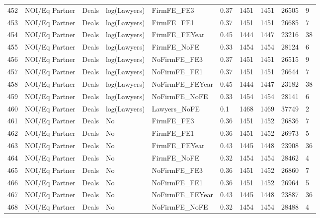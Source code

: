 \documentclass{article}
\begin{document}
\begin{table}[H]
\begin{tabular}{rlllllllll}
  452 & NOI/Eq Partner & Deals & log(Lawyers) & FirmFE\_FE3 & 0.37 & 1451 & 1451 & 26505 & 9 \\ 
  453 & NOI/Eq Partner & Deals & log(Lawyers) & FirmFE\_FE1 & 0.37 & 1451 & 1451 & 26685 & 7 \\ 
  454 & NOI/Eq Partner & Deals & log(Lawyers) & FirmFE\_FEYear & 0.45 & 1444 & 1447 & 23216 & 38 \\ 
  455 & NOI/Eq Partner & Deals & log(Lawyers) & FirmFE\_NoFE & 0.33 & 1454 & 1454 & 28124 & 6 \\ 
  456 & NOI/Eq Partner & Deals & log(Lawyers) & NoFirmFE\_FE3 & 0.37 & 1451 & 1451 & 26515 & 9 \\ 
  457 & NOI/Eq Partner & Deals & log(Lawyers) & NoFirmFE\_FE1 & 0.37 & 1451 & 1451 & 26644 & 7 \\ 
  458 & NOI/Eq Partner & Deals & log(Lawyers) & NoFirmFE\_FEYear & 0.45 & 1444 & 1447 & 23182 & 38 \\ 
  459 & NOI/Eq Partner & Deals & log(Lawyers) & NoFirmFE\_NoFE & 0.33 & 1454 & 1454 & 28141 & 6 \\ 
  460 & NOI/Eq Partner & Deals & log(Lawyers) & Lawyers\_NoFE & 0.1 & 1468 & 1469 & 37749 & 2 \\ 
  461 & NOI/Eq Partner & Deals & No & FirmFE\_FE3 & 0.36 & 1451 & 1452 & 26836 & 7 \\ 
  462 & NOI/Eq Partner & Deals & No & FirmFE\_FE1 & 0.36 & 1451 & 1452 & 26973 & 5 \\ 
  463 & NOI/Eq Partner & Deals & No & FirmFE\_FEYear & 0.43 & 1445 & 1448 & 23908 & 36 \\ 
  464 & NOI/Eq Partner & Deals & No & FirmFE\_NoFE & 0.32 & 1454 & 1454 & 28462 & 4 \\ 
  465 & NOI/Eq Partner & Deals & No & NoFirmFE\_FE3 & 0.36 & 1451 & 1452 & 26860 & 7 \\ 
  466 & NOI/Eq Partner & Deals & No & NoFirmFE\_FE1 & 0.36 & 1451 & 1452 & 26964 & 5 \\ 
  467 & NOI/Eq Partner & Deals & No & NoFirmFE\_FEYear & 0.43 & 1445 & 1448 & 23887 & 36 \\ 
  468 & NOI/Eq Partner & Deals & No & NoFirmFE\_NoFE & 0.32 & 1454 & 1454 & 28488 & 4 \\ 
   \hline
\end{tabular}
\end{table}
\end{document}
